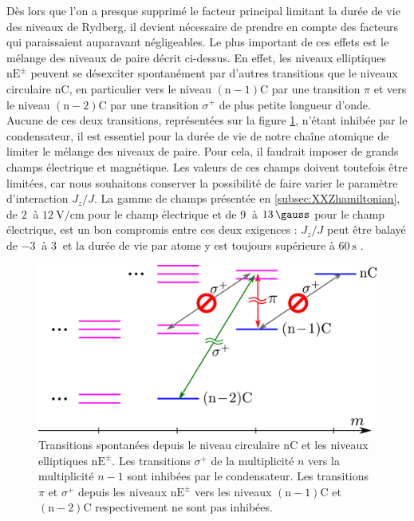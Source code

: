 \noindent Dès lors que l'on a presque supprimé le facteur principal limitant la durée de vie des niveaux de Rydberg, il devient nécessaire de prendre en compte des facteurs qui paraissaient auparavant négligeables.
Le plus important de ces effets est le mélange des niveaux de paire décrit ci-dessus.
En effet, les niveaux elliptiques $\mathrm{nE^{\pm}}$ peuvent se désexciter spontanément par d'autres transitions que le niveaux circulaire $\mathrm{nC}$, en particulier vers le niveau $\mathrm{(n-1)C}$ par une transition $\pi$ et vers le niveau $\mathrm{(n-2)C}$ par une transition $\sigma^+$ de plus petite longueur d'onde.
Aucune de ces deux transitions, représentées sur la figure \ref{fig:sigma_pi}, n'étant inhibée par le condensateur, il est essentiel pour la durée de vie de notre chaîne atomique de limiter le mélange des niveaux de paire.
Pour cela, il faudrait imposer de grands champs électrique et magnétique.
Les valeurs de ces champs doivent toutefois être limitées, car nous souhaitons conserver la possibilité de faire varier le paramètre d'interaction $J_z/J$.
La gamme de champs présentée en \ref{subsec:XXZhamiltonian}, de $\SI{2}{}$ à $\SI{12}{\V/\cm}$ pour le champ électrique et de $\SI{9}{}$ à $\SI{13}{\gauss}$ pour le champ électrique, est un bon compromis entre ces deux exigences : $J_z/J$ peut être balayé de $\SI{-3}{}$ à $\SI[retain-explicit-plus]{+3}{}$ et la durée de vie par atome y est toujours supérieure à $\SI{60}{\s}$ \cite{ENS_PRE_CIRCSIM}.
\begin{figure}[h]
\centering
\includegraphics[width=0.7 \linewidth]{figures/circsim/sigma_pi}
\caption[Transitions spontanées depuis les niveaux elliptiques $\mathrm{nE^\pm}$]{
Transitions spontanées depuis le niveau circulaire $\mathrm{nC}$ et les niveaux elliptiques $\mathrm{nE^\pm}$.
Les transitions $\sigma^+$ de la multiplicité $n$ vers la multiplicité $n-1$ sont inhibées par le condensateur.
Les transitions $\pi$ et $\sigma^+$ depuis les niveaux $\mathrm{nE^\pm}$ vers les niveaux $\mathrm{(n-1)C}$ et $\mathrm{(n-2)C}$ respectivement ne sont pas inhibées.
}
\label{fig:sigma_pi}
\end{figure}

